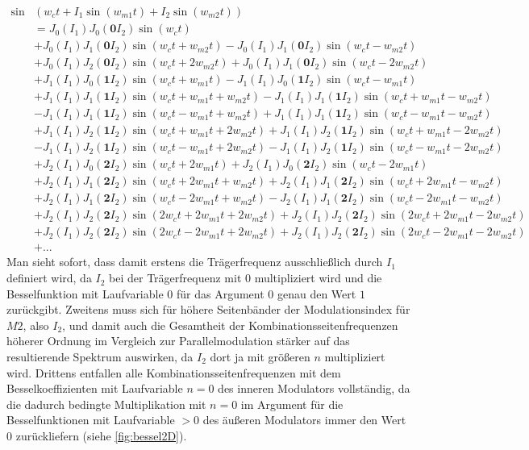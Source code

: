 \begin{equation}
\begin{split}
\sin&(w_ct + I_1\sin(w_{m1}t) + I_2\sin(w_{m2}t)) \\
&= J_0(I_1)J_0(\mathbf{0}I_2)\sin(w_ct) \\
&+ J_0(I_1)J_1(\mathbf{0}I_2)\sin(w_ct + w_{m2}t) - J_0(I_1)J_1(\mathbf{0}I_2)\sin(w_ct - w_{m2}t) \\
&+ J_0(I_1)J_2(\mathbf{0}I_2)\sin(w_ct + 2w_{m2}t) + J_0(I_1)J_1(\mathbf{0}I_2)\sin(w_ct - 2w_{m2}t) \\
&+ J_1(I_1)J_0(\mathbf{1}I_2)\sin(w_ct + w_{m1}t) - J_1(I_1)J_0(\mathbf{1}I_2)\sin(w_ct - w_{m1}t) \\
&+ J_1(I_1)J_1(\mathbf{1}I_2)\sin(w_ct + w_{m1}t + w_{m2}t) - J_1(I_1)J_1(\mathbf{1}I_2)\sin(w_ct + w_{m1}t - w_{m2}t) \\
&- J_1(I_1)J_1(\mathbf{1}I_2)\sin(w_ct - w_{m1}t + w_{m2}t) + J_1(I_1)J_1(\mathbf{1}I_2)\sin(w_ct - w_{m1}t - w_{m2}t) \\
&+ J_1(I_1)J_2(\mathbf{1}I_2)\sin(w_ct + w_{m1}t + 2w_{m2}t) + J_1(I_1)J_2(\mathbf{1}I_2)\sin(w_ct + w_{m1}t - 2w_{m2}t) \\
&- J_1(I_1)J_2(\mathbf{1}I_2)\sin(w_ct - w_{m1}t + 2w_{m2}t) - J_1(I_1)J_2(\mathbf{1}I_2)\sin(w_ct - w_{m1}t - 2w_{m2}t) \\
&+ J_2(I_1)J_0(\mathbf{2}I_2)\sin(w_ct + 2w_{m1}t) + J_2(I_1)J_0(\mathbf{2}I_2)\sin(w_ct - 2w_{m1}t) \\
&+ J_2(I_1)J_1(\mathbf{2}I_2)\sin(w_ct + 2w_{m1}t + w_{m2}t) + J_2(I_1)J_1(\mathbf{2}I_2)\sin(w_ct + 2w_{m1}t - w_{m2}t) \\
&+ J_2(I_1)J_1(\mathbf{2}I_2)\sin(w_ct - 2w_{m1}t + w_{m2}t) - J_2(I_1)J_1(\mathbf{2}I_2)\sin(w_ct - 2w_{m1}t - w_{m2}t) \\
&+ J_2(I_1)J_2(\mathbf{2}I_2)\sin(2w_ct + 2w_{m1}t + 2w_{m2}t) + J_2(I_1)J_2(\mathbf{2}I_2)\sin(2w_ct + 2w_{m1}t - 2w_{m2}t) \\
&+ J_2(I_1)J_2(\mathbf{2}I_2)\sin(2w_ct - 2w_{m1}t + 2w_{m2}t) + J_2(I_1)J_2(\mathbf{2}I_2)\sin(2w_ct - 2w_{m1}t - 2w_{m2}t) \\
&+ ... 
\end{split}
\end{equation}
\label{Kaskadenspecials}
Man sieht sofort, dass damit erstens die Trägerfrequenz ausschließlich durch $ I_1 $ definiert wird, da $ I_2 $ bei der Trägerfrequenz mit $0$ multipliziert wird und die Besselfunktion mit Laufvariable 0 für das Argument $0$ genau den Wert $1$ zurückgibt. Zweitens muss sich für höhere Seitenbänder der Modulationsindex für $M2$, also $ I_2 $, und damit auch die Gesamtheit der Kombinationsseitenfrequenzen höherer Ordnung im Vergleich zur Parallelmodulation stärker auf das resultierende Spektrum auswirken, da $ I_2 $ dort ja mit größeren $n$ multipliziert wird. Drittens entfallen alle Kombinationsseitenfrequenzen mit dem Besselkoeffizienten mit Laufvariable $n = 0$ des inneren Modulators vollständig, da die dadurch bedingte Multiplikation mit $n = 0$ im Argument für die Besselfunktionen mit Laufvariable $>0$ des äußeren Modulators immer den Wert $0$ zurückliefern (siehe \ref{fig:bessel2D}). 

